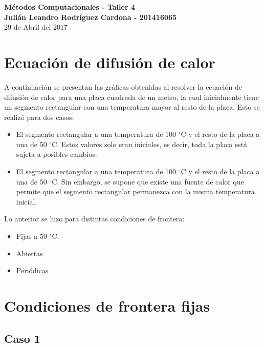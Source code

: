 \documentclass[12pt,letterpaper]{article}
\begin{document}
\begin{center}
{\Large \textbf{Métodos Computacionales - Taller 4}}\\
\vspace{0.3cm}
\textbf{Julián Leandro Rodríguez Cardona - 201416065}\\ \vspace{0.3cm}
29 de Abril del 2017
\end{center}

\section*{Ecuación de difusión de calor}

A continuación se presentan las gráficas obtenidas al resolver la ecuación de difusión de calor para una placa cuadrada de un metro, la cual inicialmente tiene un segmento rectangular con una temperatura mayor al resto de la placa. Esto se realizó para dos casos:

\begin{itemize}
\item El segmento rectangular a una temperatura de 100 $^{\circ}$C y el resto de la placa a una de 50 $^{\circ}$C. Estos valores solo eran iniciales, es decir, toda la placa está sujeta a posibles cambios.
\item El segmento rectangular a una temperatura de 100 $^{\circ}$C y el resto de la placa a una de 50 $^{\circ}$C. Sin embargo, se supone que existe una fuente de calor que permite que el segmento rectangular permanezca con la misma temperatura inicial.
\end{itemize}

Lo anterior se hizo para distintas condiciones de frontera:\\

\begin{itemize}
\item Fijas a 50 $^{\circ}$C.
\item Abiertas
\item Periódicas
\end{itemize}

\section*{Condiciones de frontera fijas}

\subsection*{Caso 1}
\end{document}
